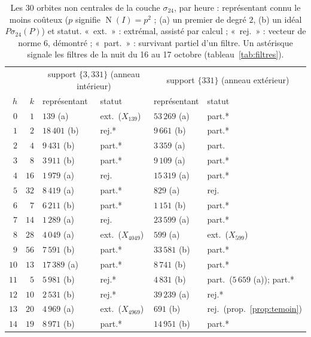 \documentclass[11pt,a4paper]{amsart}
\theoremstyle{plain}
\theoremstyle{definition}
\DeclareMathOperator{\Nm}{N}
\begin{document}
\begin{table}[ht]
\caption{Les $30$ orbites non centrales de la couche $\sigma_{24}$, par heure : représentant connu le moins coûteux ($p$ signifie $\Nm(I)=p^2$ ; (a) un premier de degré $2$, (b) un idéal $P\sigma_{24}(P)$) et statut. «~ext.~» : extrémal, assisté par calcul ; «~rej.~» : vecteur de norme $6$, démontré ; «~part.~» : survivant partiel d'un filtre. Un astérisque signale les filtres de la nuit du 16 au 17 octobre (tableau~\ref{tab:filtres}).}\label{tab:census}
\centering\small\setlength{\tabcolsep}{5pt}
\begin{tabular}{rr ll ll}
\toprule
& & \multicolumn{2}{c}{support $\{3,331\}$ (anneau intérieur)} & \multicolumn{2}{c}{support $\{331\}$ (anneau extérieur)} \\
\cmidrule(lr){3-4}\cmidrule(lr){5-6}
$h$ & $k$ & représentant & statut & représentant & statut \\
\midrule
$0$ & $1$ & $139$ (a) & ext.\ ($X_{139}$) & $53\,269$ (a) & part.* \\
$1$ & $2$ & $18\,401$ (b) & rej.* & $9\,661$ (b) & part.* \\
$2$ & $4$ & $9\,431$ (b) & part.* & $3\,359$ (a) & part. \\
$3$ & $8$ & $3\,911$ (b) & part.* & $9\,109$ (a) & part.* \\
$4$ & $16$ & $1\,979$ (a) & rej. & $15\,319$ (a) & part.* \\
$5$ & $32$ & $8\,419$ (a) & part.* & $829$ (a) & rej. \\
$6$ & $7$ & $6\,211$ (b) & part.* & $1\,151$ (b) & part.* \\
$7$ & $14$ & $1\,289$ (a) & rej. & $23\,599$ (a) & part.* \\
$8$ & $28$ & $4\,049$ (a) & ext.\ ($X_{4049}$) & $599$ (a) & ext.\ ($X_{599}$) \\
$9$ & $56$ & $7\,591$ (b) & part.* & $33\,581$ (b) & part.* \\
$10$ & $13$ & $17\,389$ (a) & part.* & $8\,741$ (b) & part.* \\
$11$ & $5$ & $5\,981$ (b) & rej.* & $4\,831$ (b) & part.\ ($5\,659$ (a)); part.* \\
$12$ & $10$ & $2\,531$ (b) & rej.* & $39\,239$ (a) & rej.* \\
$13$ & $20$ & $4\,969$ (a) & ext.\ ($X_{4969}$) & $691$ (b) & rej.\ (prop.~\ref{prop:temoin}) \\
$14$ & $19$ & $8\,971$ (b) & part.* & $14\,951$ (b) & part.* \\
\bottomrule
\end{tabular}
\end{table}
\end{document}
